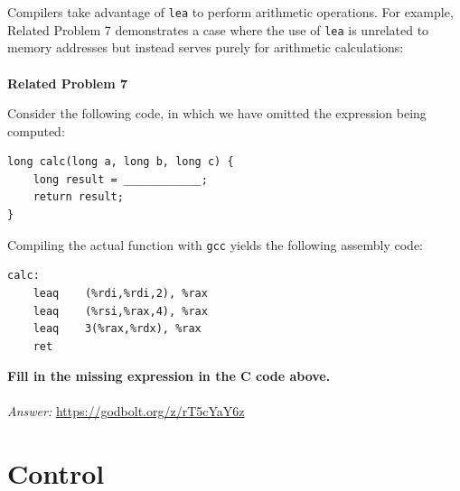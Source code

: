 \documentclass{article}
\begin{document}
Compilers take advantage of \texttt{lea} to perform arithmetic operations. For example, Related Problem 7 demonstrates a case where the use of \texttt{lea} is unrelated to memory addresses but instead serves purely for arithmetic calculations: \\
\\
%
\noindent\textbf{Related Problem 7}

Consider the following code, in which we have omitted the expression being computed:

\begin{verbatim}
long calc(long a, long b, long c) {
    long result = ____________;
    return result;
}
\end{verbatim}

Compiling the actual function with \texttt{gcc} yields the following assembly code:

\begin{verbatim}
calc:
    leaq    (%rdi,%rdi,2), %rax
    leaq    (%rsi,%rax,4), %rax
    leaq    3(%rax,%rdx), %rax
    ret
\end{verbatim}
\textbf{Fill in the missing expression in the C code above.} \\
\\
\textit{Answer: }\url{https://godbolt.org/z/rT5cYaY6z}
\section{Control}
\end{document}
